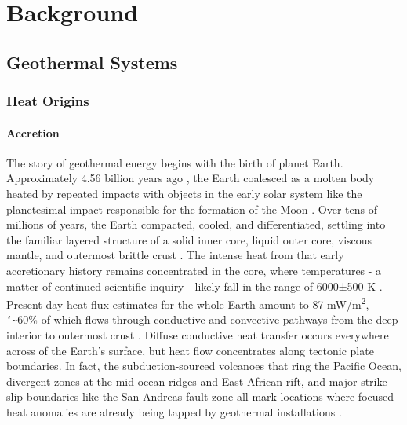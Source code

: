 \chapter{Background}\label{ch2:background}

\section{Geothermal Systems}\label{ch2:geosys}
\subsection{Heat Origins}
\subsubsection{Accretion}
The story of geothermal energy begins with the birth of planet Earth. Approximately 4.56 billion years ago \citep{allegre_age_1995, patterson_age_1956}, the Earth coalesced as a molten body heated by repeated impacts with objects in the early solar system like the planetesimal impact responsible for the formation of the Moon \citep{stevenson_origin_2014}. Over tens of millions of years, the Earth compacted, cooled, and differentiated, settling into the familiar layered structure of a solid inner core, liquid outer core, viscous mantle, and outermost brittle crust \citep[~p. 7]{press_understanding_2004}. The intense heat from that early accretionary history remains concentrated in the core, where temperatures - a matter of continued scientific inquiry - likely fall in the range of 6000±500 K \citep[~p. 372]{fowler_solid_2005}. Present day heat flux estimates for the whole Earth amount to 87 mW/m\textsuperscript{2}, \texttt{\char`\~}60\% of which flows through conductive and convective pathways from the deep interior to outermost crust \citep{stein_heat_1995}. Diffuse conductive heat transfer occurs everywhere across of the Earth’s surface, but heat flow concentrates along tectonic plate boundaries. In fact, the subduction-sourced volcanoes that ring the Pacific Ocean, divergent zones at the mid-ocean ridges and East African rift, and major strike-slip boundaries like the San Andreas fault zone all mark locations where focused heat anomalies are already being tapped by geothermal installations \citep[~p. 16]{dipippo_geothermal_2012}.
